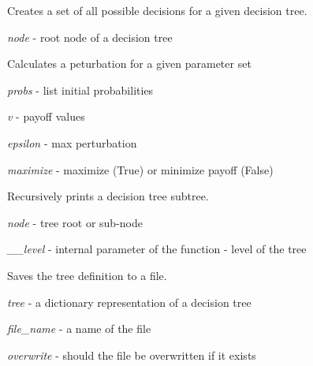 \documentclass[a4paper,10pt,english]{sphinxmanual}
\begin{document}

\begin{fulllineitems}
	\label{index:chondro.node_branching}
	Creates a set of all possible decisions for a given decision tree.
	
	\emph{node} - root node of a decision tree
	
\end{fulllineitems}


\begin{fulllineitems}
	\label{index:chondro.perturb}
	Calculates a peturbation for a given parameter set
	
	\emph{probs} - list initial probabilities
	
	\emph{v} - payoff values
	
	\emph{epsilon} - max perturbation
	
	\emph{maximize} - maximize (True) or minimize payoff (False)
	
\end{fulllineitems}


\begin{fulllineitems}
	\label{index:chondro.print_tree}
	Recursively prints a decision tree subtree.
	
	\emph{node} - tree root or sub-node
	
	\emph{\_\_level} - internal parameter of the function - level of the tree
	
\end{fulllineitems}


\begin{fulllineitems}
	\label{index:chondro.save_tree}
	Saves the tree definition to a file.
	
	\emph{tree} - a dictionary representation of a decision tree
	
	\emph{file\_name} - a name of the file
	
	\emph{overwrite} - should the file be overwritten if it exists
	
\end{fulllineitems}
\end{document}
